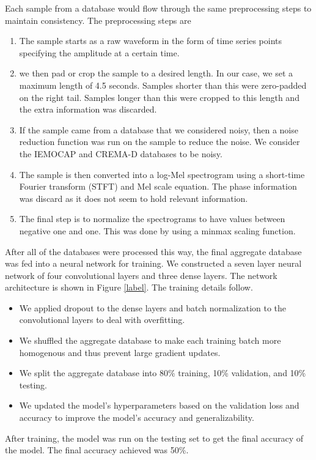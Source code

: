 \documentclass[conference]{IEEEtran}
\begin{document}
Each sample from a database would flow through the same preprocessing steps to maintain consistency. The preprocessing steps are
\begin{enumerate}
	\item The sample starts as a raw waveform in the form of time series points specifying the amplitude at a certain time.
	\item we then pad or crop the sample to a desired length. In our case, we set a maximum length of 4.5 seconds. Samples shorter than this were zero-padded on the right tail. Samples longer than this were cropped to this length and the extra information was discarded.
	\item If the sample came from a database that we considered noisy, then a noise reduction function was run on the sample to reduce the noise. We consider the IEMOCAP and CREMA-D databases to be noisy.
	\item The sample is then converted into a log-Mel spectrogram using a short-time Fourier transform (STFT) and Mel scale equation. The phase information was discard as it does not seem to hold relevant information. \cite{}
	\item The final step is to normalize the spectrograms to have values between negative one and one. This was done by using a minmax scaling function.
\end{enumerate}

After all of the databases were processed this way, the final aggregate database was fed into a neural network for training. We constructed a seven layer neural network of four convolutional layers and three dense layers. The network architecture is shown in Figure \ref{label}. The training details follow.
\begin{itemize}
	\item We applied dropout to the dense layers and batch normalization to the convolutional layers to deal with overfitting.
	\item We shuffled the aggregate database to make each training batch more homogenous and thus prevent large gradient updates.
	\item We split the aggregate database into 80\% training, 10\% validation, and 10\% testing.
	\item We updated the model's hyperparameters based on the validation loss and accuracy to improve the model's accuracy and generalizability.
\end{itemize}
After training, the model was run on the testing set to get the final accuracy of the model. The final accuracy achieved was 50\%.
\end{document}

